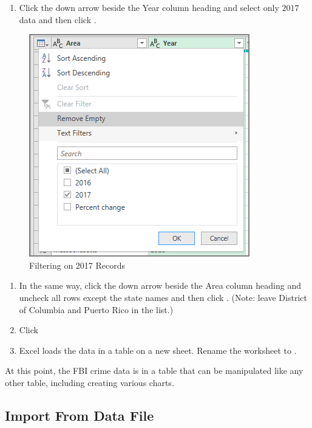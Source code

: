 \begin{enumerate}[resume]
	\item Click the down arrow beside the Year column heading and select only $ 2017 $ data and then click .
\end{enumerate}

\begin{figure}[H]
	\centering
	\includegraphics[width=\maxwidth{.95\linewidth}]{gfx/ch07_fig02f}
	\caption{Filtering on 2017 Records}
	\label{07:fig02f}
\end{figure}

\begin{enumerate}[resume]
	\item In the same way, click the down arrow beside the Area column heading and uncheck all rows except the state names and then click . (Note: leave District of Columbia and Puerto Rico in the list.)
	\item Click 
	\item Excel loads the data in a table on a new sheet. Rename the worksheet to .		
\end{enumerate}

At this point, the FBI crime data is in a table that can be manipulated like any other table, including creating various charts.

\subsection{Import From Data File}\label{07:ImportFromDataFile}

